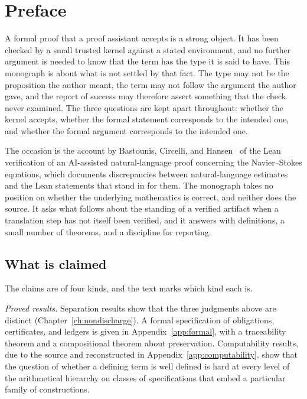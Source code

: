 \chapter*{Preface}

A formal proof that a proof assistant accepts is a strong object. It has been checked by a small trusted kernel against a stated environment, and no further argument is needed to know that the term has the type it is said to have. This monograph is about what is not settled by that fact. The type may not be the proposition the author meant, the term may not follow the argument the author gave, and the report of success may therefore assert something that the check never examined. The three questions are kept apart throughout: whether the kernel accepts, whether the formal statement corresponds to the intended one, and whether the formal argument corresponds to the intended one.

The occasion is the account by Bastounis, Circelli, and Hansen~\cite{BCH26} of the Lean verification of an AI-assisted natural-language proof concerning the Navier--Stokes equations, which documents discrepancies between natural-language estimates and the Lean statements that stand in for them. The monograph takes no position on whether the underlying mathematics is correct, and neither does the source. It asks what follows about the standing of a verified artifact when a translation step has not itself been verified, and it answers with definitions, a small number of theorems, and a discipline for reporting.

\section*{What is claimed}

The claims are of four kinds, and the text marks which kind each is.

\emph{Proved results.} Separation results show that the three judgments above are distinct (Chapter~\ref{ch:nondischarge}). A formal specification of obligations, certificates, and ledgers is given in Appendix~\ref{app:formal}, with a traceability theorem and a compositional theorem about preservation. Computability results, due to the source and reconstructed in Appendix~\ref{app:computability}, show that the question of whether a defining term is well defined is hard at every level of the arithmetical hierarchy on classes of specifications that embed a particular family of constructions.

